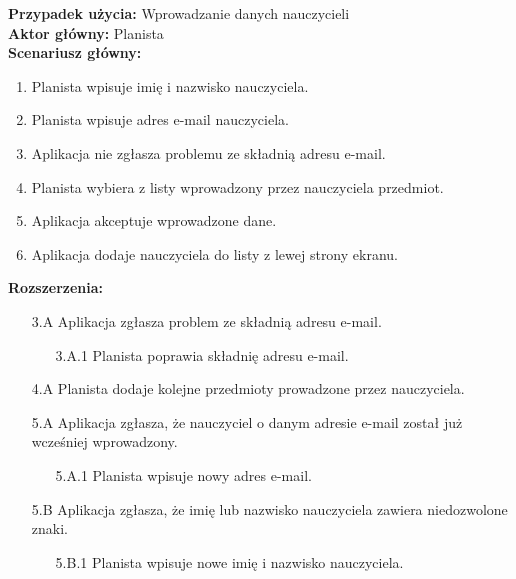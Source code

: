 \noindent
\textbf{Przypadek użycia:} Wprowadzanie danych nauczycieli\\
\textbf{Aktor główny:} Planista\\
\textbf{Scenariusz główny:}
\begin{enumerate}
	\item Planista wpisuje imię i nazwisko nauczyciela.
	\item Planista wpisuje adres e-mail nauczyciela.
	\item Aplikacja nie zgłasza problemu ze składnią adresu e-mail.
	\item Planista wybiera z listy wprowadzony przez nauczyciela przedmiot.
	\item Aplikacja akceptuje wprowadzone dane.
	\item Aplikacja dodaje nauczyciela do listy z lewej strony ekranu.
\end{enumerate}
\textbf{Rozszerzenia:}
	\begin{enumerate}
         \item[3.A] Aplikacja zgłasza problem ze składnią adresu e-mail.
         \begin{enumerate}
         	\item[3.A.1] Planista poprawia składnię adresu e-mail.
         \end{enumerate}
         \item[4.A] Planista dodaje kolejne przedmioty prowadzone przez nauczyciela.
         \item[5.A] Aplikacja zgłasza, że nauczyciel o danym adresie e-mail został już wcześniej wprowadzony.
         \begin{enumerate}
         	\item[5.A.1] Planista wpisuje nowy adres e-mail.
         \end{enumerate}
         \item[5.B] Aplikacja zgłasza, że imię lub nazwisko nauczyciela zawiera niedozwolone znaki.
         \begin{enumerate}
         	\item[5.B.1] Planista wpisuje nowe imię i nazwisko nauczyciela.
         \end{enumerate}
	\end{enumerate}


